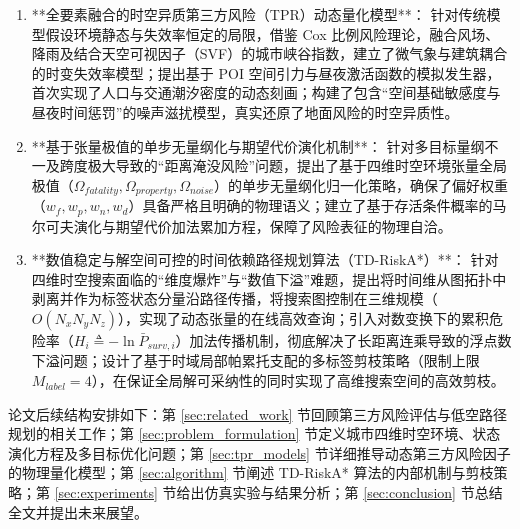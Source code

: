 \begin{enumerate}
    \item **全要素融合的时空异质第三方风险（TPR）动态量化模型**：
    针对传统模型假设环境静态与失效率恒定的局限，借鉴 Cox 比例风险理论，融合风场、降雨及结合天空可视因子（SVF）的城市峡谷指数，建立了微气象与建筑耦合的时变失效率模型；提出基于 POI 空间引力与昼夜激活函数的模拟发生器，首次实现了人口与交通潮汐密度的动态刻画；构建了包含“空间基础敏感度与昼夜时间惩罚”的噪声滋扰模型，真实还原了地面风险的时空异质性。
    
    \item **基于张量极值的单步无量纲化与期望代价演化机制**：
    针对多目标量纲不一及跨度极大导致的“距离淹没风险”问题，提出了基于四维时空环境张量全局极值（$\Omega_{fatality}, \Omega_{property}, \Omega_{noise}$）的单步无量纲化归一化策略，确保了偏好权重（$w_f, w_p, w_n, w_d$）具备严格且明确的物理语义；建立了基于存活条件概率的马尔可夫演化与期望代价加法累加方程，保障了风险表征的物理自洽。
    
    \item **数值稳定与解空间可控的时间依赖路径规划算法（TD-RiskA*）**：
    针对四维时空搜索面临的“维度爆炸”与“数值下溢”难题，提出将时间维从图拓扑中剥离并作为标签状态分量沿路径传播，将搜索图控制在三维规模（$O(N_x N_y N_z)$），实现了动态张量的在线高效查询；引入对数变换下的累积危险率（$H_i \triangleq -\ln \bar{P}_{surv,i}$）加法传播机制，彻底解决了长距离连乘导致的浮点数下溢问题；设计了基于时域局部帕累托支配的多标签剪枝策略（限制上限 $M_{label}=4$），在保证全局解可采纳性的同时实现了高维搜索空间的高效剪枝。
\end{enumerate}

论文后续结构安排如下：第 \ref{sec:related_work} 节回顾第三方风险评估与低空路径规划的相关工作；第 \ref{sec:problem_formulation} 节定义城市四维时空环境、状态演化方程及多目标优化问题；第 \ref{sec:tpr_models} 节详细推导动态第三方风险因子的物理量化模型；第 \ref{sec:algorithm} 节阐述 TD-RiskA* 算法的内部机制与剪枝策略；第 \ref{sec:experiments} 节给出仿真实验与结果分析；第 \ref{sec:conclusion} 节总结全文并提出未来展望。
